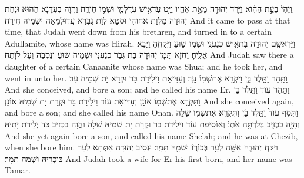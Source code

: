 \newperek
\newseder
{}%
{וַֽיְהִי֙ בָּעֵ֣ת הַהִ֔וא וַיֵּ֥רֶד יְהוּדָ֖ה מֵאֵ֣ת אֶחָ֑יו וַיֵּ֛ט עַד\maqqaf אִ֥ישׁ עֲדֻלָּמִ֖י וּשְׁמ֥וֹ חִירָֽה׃}
{וַהֲוָה בְּעִדָּנָא הַהוּא וּנְחַת יְהוּדָה מִלְּוָת אֲחוֹהִי וּסְטָא לְוָת גֻּבְרָא עֲדוּלְמָאָה וּשְׁמֵיהּ חִירָה׃}
{And it came to pass at that time, that Judah went down from his brethren, and turned in to a certain Adullamite, whose name was Hirah.}{}
{וַיַּרְא\maqqaf שָׁ֧ם יְהוּדָ֛ה בַּת\maqqaf אִ֥ישׁ כְּנַעֲנִ֖י וּשְׁמ֣וֹ שׁ֑וּעַ וַיִּקָּחֶ֖הָ וַיָּבֹ֥א אֵלֶֽיהָ׃}
{וַחֲזָא תַּמָּן יְהוּדָה בַּת גְּבַר כְּנַעֲנִי וּשְׁמֵיהּ שׁוּעַ וְנַסְבַּהּ וְעָל לְוָתַהּ׃}
{And Judah saw there a daughter of a certain Canaanite whose name was Shua; and he took her, and went in unto her.}{}
{וַתַּ֖הַר וַתֵּ֣לֶד בֵּ֑ן וַיִּקְרָ֥א אֶת\maqqaf שְׁמ֖וֹ עֵֽר׃}
{וְעַדִּיאַת וִילֵידַת בַּר וּקְרָא יָת שְׁמֵיהּ עֵר׃}
{And she conceived, and bore a son; and he called his name Er.}{}
{וַתַּ֥הַר ע֖וֹד וַתֵּ֣לֶד בֵּ֑ן וַתִּקְרָ֥א אֶת\maqqaf שְׁמ֖וֹ אוֹנָֽן׃}
{וְעַדִּיאַת עוֹד וִילֵידַת בַּר וּקְרָת יָת שְׁמֵיהּ אוֹנָן׃}
{And she conceived again, and bore a son; and she called his name Onan.}{}
{וַתֹּ֤סֶף עוֹד֙ וַתֵּ֣לֶד בֵּ֔ן וַתִּקְרָ֥א אֶת\maqqaf שְׁמ֖וֹ שֵׁלָ֑ה וְהָיָ֥ה בִכְזִ֖יב בְּלִדְתָּ֥הּ אֹתֽוֹ׃}
{וְאוֹסֵיפַת עוֹד וִילֵידַת בַּר וּקְרָת יָת שְׁמֵיהּ שֵׁלָה וַהֲוָה בִּכְזִיב כַּד יְלֵידַת יָתֵיהּ׃}
{And she yet again bore a son, and called his name Shelah; and he was at Chezib, when she bore him.}{}
{וַיִּקַּ֧ח יְהוּדָ֛ה אִשָּׁ֖ה לְעֵ֣ר בְּכוֹר֑וֹ וּשְׁמָ֖הּ תָּמָֽר׃}
{וּנְסֵיב יְהוּדָה אִתְּתָא לְעֵר בּוּכְרֵיהּ וּשְׁמַהּ תָּמָר׃}
{And Judah took a wife for Er his first-born, and her name was Tamar.}{}
